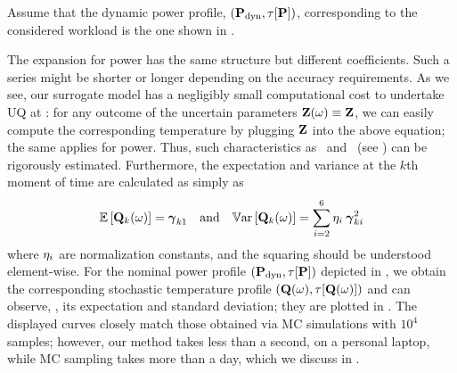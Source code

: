 
Assume that the dynamic power profile, $\profilePdyn$, corresponding to the considered workload is the one shown in .


The expansion for power has the same structure but different coefficients.
Such a series might be shorter or longer depending on the accuracy requirements.
As we see, our surrogate model has a negligibly small computational cost to undertake UQ at : for any outcome of the uncertain parameters $\mathbf{Z}(\omega) \equiv \mathbf{Z}$, we can easily compute the corresponding temperature by plugging $\mathbf{Z}$ into the above equation; the same applies for power.
Thus, such characteristics as \cdfs\ and \pdfs\ (see ) can be rigorously estimated. Furthermore, the expectation and variance at the $k$th moment of time are calculated as simply as
\[
  \mathbb{E}\left[\mathbf{Q}_k(\omega)\right] = {\boldsymbol\gamma}_{k1} \hspace{1em} \text{and} \hspace{1em} \mathbb{V}\text{ar}\left[\mathbf{Q}_k(\omega)\right] = \sum_{i = 2}^{6} \eta_i \: {\boldsymbol\gamma}_{ki}^2
\]
where $\eta_i$ are normalization constants, and the squaring should be understood element-wise.
For the nominal power profile $\profilePdyn$ depicted in , we obtain the corresponding stochastic temperature profile $\profileT{\o}$ and can observe, \eg, its expectation and standard deviation; they are plotted in .
The displayed curves closely match those obtained via MC simulations with $10^4$ samples; however, our method takes less than a second, on a personal laptop, while MC sampling takes more than a day, which we discuss in .
